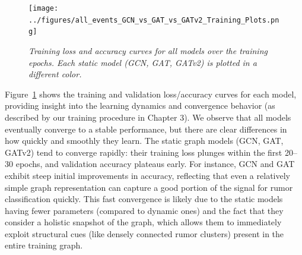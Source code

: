 \documentclass{cshonours}
\begin{document}
\begin{figure}

\centering

\texttt{[image: ../figures/all\_events\_GCN\_vs\_GAT\_vs\_GATv2\_Training\_Plots.png]}

\caption[Training loss and accuracy curves]{\textit{Training loss and accuracy curves for all models over the training epochs. Each static model (GCN, GAT, GATv2) is plotted in a different color.}}

\label{fig:training_curves}

\end{figure}



Figure~\ref{fig:training_curves} shows the training and validation loss/accuracy curves for each model, providing insight into the learning dynamics and convergence behavior (as described by our training procedure in Chapter 3). We observe that all models eventually converge to a stable performance, but there are clear differences in how quickly and smoothly they learn. The static graph models (GCN, GAT, GATv2) tend to converge rapidly: their training loss plunges within the first 20--30 epochs, and validation accuracy plateaus early. For instance, GCN and GAT exhibit steep initial improvements in accuracy, reflecting that even a relatively simple graph representation can capture a good portion of the signal for rumor classification quickly. This fast convergence is likely due to the static models having fewer parameters (compared to dynamic ones) and the fact that they consider a holistic snapshot of the graph, which allows them to immediately exploit structural cues (like densely connected rumor clusters) present in the entire training graph.
\end{document}
